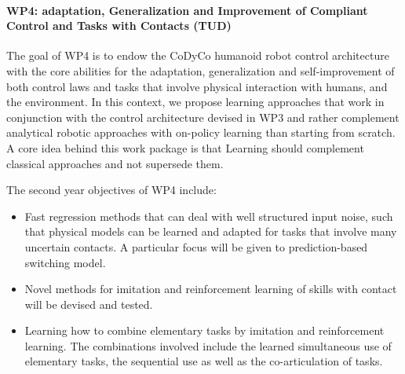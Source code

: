 \paragraph{WP4: adaptation, Generalization and Improvement of Compliant Control and Tasks with Contacts (TUD)}

The goal of WP4 is to endow the CoDyCo humanoid robot control architecture with the core abilities for the
adaptation, generalization and self-improvement of both control laws and tasks that involve physical interaction
with humans, and the environment. In this context, we propose learning approaches that work in conjunction
with the control architecture devised in WP3 and rather complement analytical robotic approaches with on-policy
learning than starting from scratch. A core idea behind this work package is that Learning should complement
classical approaches and not supersede them.

The second year objectives of WP4 include:
\begin{itemize}
 \item Fast regression methods that can deal with well structured input noise, such that physical models can
be learned and adapted for tasks that involve many uncertain contacts. A particular focus will be given to
prediction-based switching model.
\item Novel methods for imitation and reinforcement learning of skills with contact will be devised and tested. 
\item Learning how to combine elementary tasks by imitation and reinforcement learning. The combinations involved
include the learned simultaneous use of elementary tasks, the sequential use as well as the co-articulation of
tasks.
\end{itemize}

